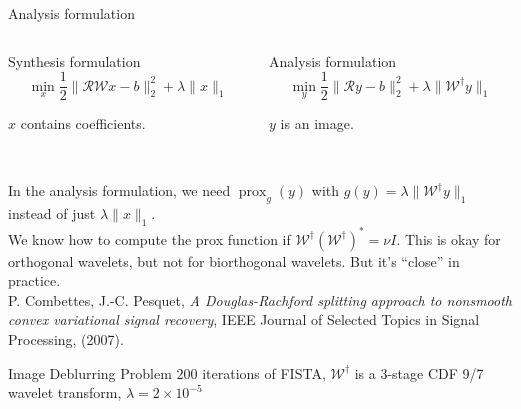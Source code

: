 \documentclass[xcolor=dvipsnames,t]{beamer} %
\newcommand\scalemath[2]{\scalebox{#1}{\mbox{\ensuremath{\displaystyle #2}}}}
\begin{document}
\begin{frame}{Analysis formulation}
   \begin{columns}
      \begin{column}{0.5\textwidth}
         Synthesis formulation\\[-1em]
         \[ \min_x \dfrac{1}{2}\|\mathcal{RW}x-b\|_2^2 + \lambda \|x\|_1 \]

         $x$ contains coefficients.\\
      \end{column}

      \begin{column}{0.5\textwidth}
         Analysis formulation\\[-1em]
         \[ \min_y \dfrac{1}{2}\|\mathcal{R}y-b\|_2^2 + \lambda \|\mathcal{W}^\dagger y\|_1 \] 

         $y$ is an image.
      \end{column}
   \end{columns}
   
   ~\\
   In the analysis formulation, we need $\operatorname{prox}_g(y)$ with $g(y) = \lambda\|\mathcal{W}^\dagger y\|_1$ instead of just $\lambda\|x\|_1$.\\[1em]

   We know how to compute the prox function if $\mathcal{W}^\dagger(\mathcal{W}^\dagger)^\ast = \nu I$.  This is okay for orthogonal wavelets, but not for biorthogonal wavelets.  But it's ``close'' in practice.\\[1em]
   
   P. Combettes, J.-C. Pesquet, \emph{A Douglas-Rachford splitting approach to nonsmooth convex variational signal recovery}, IEEE Journal of Selected Topics in Signal Processing, (2007).
\end{frame}


\begin{frame}{Image Deblurring Problem}
   $200$ iterations of FISTA, $\mathcal{W}^\dagger$ is a 3-stage CDF 9/7 wavelet transform, ${\lambda = 2\times 10^{-5}}$
   \begin{center}
   \begin{columns}[t]
      \begin{column}{0.45\textwidth}
         Original image:
         \texttt{[image: ../ieee\_spm/figures/\{cameraman]}.pdf}

      \end{column}
      
      \begin{column}{0.45\textwidth}
         Using $\mathcal{W}^\ast = \tilde{\mathcal{W}}_\text{zpd}^\dagger(\mathcal{E}^\dagger)^\ast$:
         \texttt{[image: ../ieee\_spm/figures/\{cameraman\_rec\_200\_bior4.4\_sym\_trim]}.pdf}
         \[ \scalemath{0.75}{\dfrac{\|\mathcal{W}x-y\|_2}{\|y\|_2} = 7.24\times 10^{-2}} \] 
      \end{column}
   \end{columns}
   \end{center}

\end{frame}
\end{document}
